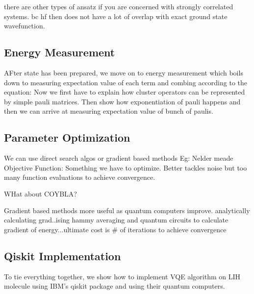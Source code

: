 \documentclass{article}
\begin{document}
there are other types of ansatz if you are concerned with strongly correlated
systems. bc hf then does not have a lot of overlap with exact ground state
wavefunction.
\subsection{Energy Measurement}
AFter state  has been prepared, we move on to energy measurement which boils
down to measuring expectation value of each term and combing according to
the equation:
Now  we first have to explain how cluster operators can be represented by
simple pauli matrices. Then show how exponentiation of pauli happens
and then we can arrive at measuring expectation value of bunch of paulis.
\subsection{Parameter Optimization}
We can use direct search algos or gradient based methods
Eg: Nelder meade
Objective Function: Something we have to optimize.
Better tackles noise but too many function evaluations to achieve convergence.

WHat about COYBLA?

Gradient based methods more useful as quantum computers improve. analytically
calculating grad..ising hammy averaging and quantum circuits to calculate
gradient of energy...ultimate cost is # of iterations to achieve convergence
\subsection{Qiskit Implementation}
To tie everything together, we show how to implement VQE algorithm on LIH
molecule using IBM's qiskit package and using their quantum computers.
\end{document}
